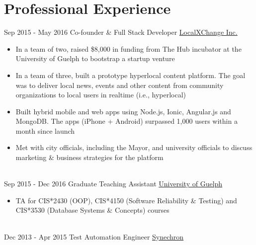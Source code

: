 \documentclass[letterpaper]{twentysecondcv} %
\begin{document}

\section{Professional Experience}

\begin{twenty} %
	\twentyitem
    	{Sep 2015 -}
		{May 2016}
        {Co-founder \& Full Stack Developer}
        {\href{http://www.localxchange.ca/}{LocalXChange Inc.}}
        {}
        {
        {\begin{itemize}
        \item In a team of two, raised \$8,000 in funding from The Hub incubator at the University of Guelph to bootstrap a startup venture
        \item In a team of three, built a prototype hyperlocal content platform. The goal was to deliver local news, events and other content from community organizations to local users in realtime (i.e., hyperlocal)
        \item Built hybrid mobile and web apps using Node.js, Ionic, Angular.js and MongoDB. The apps (iPhone + Android) surpassed 1,000 users within a month since launch
        \item Met with city officials, including the Mayor, and university officials to discuss marketing \& business strategies for the platform 
    \end{itemize}}
        }
    \\   
    \twentyitem
   		{Sep 2015 -}
		{Dec 2016}
        {Graduate Teaching Assistant}
        {\href{http://www.uoguelph.ca}{University of Guelph}}
        {}
        {
        {\begin{itemize}
        \item TA for CIS*2430 (OOP), CIS*4150 (Software Reliability \& Testing) and CIS*3530 (Database Systems \& Concepts) courses
    \end{itemize}}
        }
     \\
     \twentyitem
   		{Dec 2013 -}
		{Apr 2015}
        {Test Automation Engineer}
        {\href{http://www.synechron.com/}{Synechron}}
        {}
        {
        \begin{itemize}

\end{itemize}}
\end{twenty}
\end{document}

